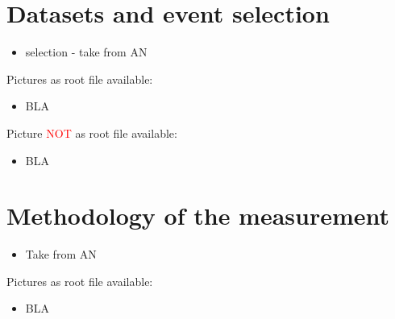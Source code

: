 \chapter{Datasets and event selection}

\begin{itemize}
\item  selection - take from AN
\end{itemize}

Pictures as root file available:
\begin{itemize}
\item BLA
\end{itemize}

Picture \textcolor{red}{NOT} as root file available:
\begin{itemize}
\item BLA
\end{itemize}

\chapter{Methodology of the measurement}

\begin{itemize}
\item Take from AN
\end{itemize}

Pictures as root file available:
\begin{itemize}
\item BLA
\end{itemize}

